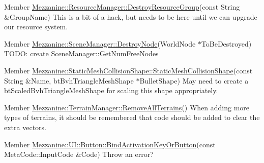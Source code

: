 \label{todo__todo000023}
\hypertarget{todo__todo000023}{}
 
\begin{DoxyDescription}
\item[Member \hyperlink{classMezzanine_1_1ResourceManager_aa827efdad18698b7d7319dab35864bbe}{Mezzanine::ResourceManager::DestroyResourceGroup}(const String \&GroupName) ]This is a bit of a hack, but needs to be here until we can upgrade our resource system. 
\end{DoxyDescription}

\label{todo__todo000024}
\hypertarget{todo__todo000024}{}
 
\begin{DoxyDescription}
\item[Member \hyperlink{classMezzanine_1_1SceneManager_ab6123477f052d34a357db85a8284c8be}{Mezzanine::SceneManager::DestroyNode}(WorldNode $\ast$ToBeDestroyed) ]TODO: create SceneManager::GetNumFreeNodes 
\end{DoxyDescription}

\label{todo__todo000003}
\hypertarget{todo__todo000003}{}
 
\begin{DoxyDescription}
\item[Member \hyperlink{classMezzanine_1_1StaticMeshCollisionShape_a1c565cc4d62ab7a0cd5cf55254905f05}{Mezzanine::StaticMeshCollisionShape::StaticMeshCollisionShape}(const String \&Name, btBvhTriangleMeshShape $\ast$BulletShape) ]May need to create a btScaledBvhTriangleMeshShape for scaling this shape appropriately. 
\end{DoxyDescription}

\label{todo__todo000025}
\hypertarget{todo__todo000025}{}
 
\begin{DoxyDescription}
\item[Member \hyperlink{classMezzanine_1_1TerrainManager_ae940f33a369e54c2322de4202d236eb2}{Mezzanine::TerrainManager::RemoveAllTerrains}() ]When adding more types of terrains, it should be remembered that code should be added to clear the extra vectors. 
\end{DoxyDescription}

\label{todo__todo000026}
\hypertarget{todo__todo000026}{}
 
\begin{DoxyDescription}
\item[Member \hyperlink{classMezzanine_1_1UI_1_1Button_aae0a7f6a07f79856ed6da8b8b3bc5ecd}{Mezzanine::UI::Button::BindActivationKeyOrButton}(const MetaCode::InputCode \&Code) ]Throw an error? 
\end{DoxyDescription}

